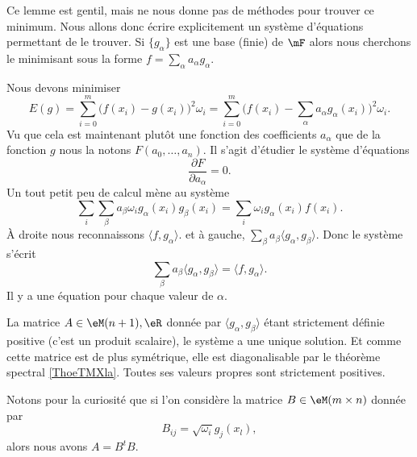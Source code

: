 \begin{normaltext}
    Ce lemme est gentil, mais ne nous donne pas de méthodes pour trouver ce minimum. Nous allons donc écrire explicitement un système d'équations permettant de le trouver. Si \( \{ g_{\alpha} \} \) est une base (finie) de \( \mF\) alors nous cherchons le minimisant sous la forme \( f=\sum_{\alpha}a_{\alpha}g_{\alpha}\). 

    Nous devons minimiser
    \begin{equation}
        E(g)=\sum_{i=0}^m\big( f(x_i)-g(x_i) \big)^2\omega_i=\sum_{i=0}^m\big( f(x_i)-\sum_{\alpha}a_{\alpha}g_{\alpha}(x_i) \big)^2\omega_i.
    \end{equation}
    Vu que cela est maintenant plutôt une fonction des coefficients \( a_{\alpha}\) que de la fonction \( g\) nous la notons \( F(a_0,\ldots, a_n)\). Il s'agit d'étudier le système d'équations
    \begin{equation}
        \frac{ \partial F }{ \partial a_{\alpha} }=0.
    \end{equation}
    Un tout petit peu de calcul mène au système
    \begin{equation}       
        \sum_i\sum_{\beta}a_{\beta}\omega_ig_{\alpha}(x_i)g_{\beta}(x_i)=\sum_{i}\omega_ig_{\alpha}(x_i)f(x_i).
    \end{equation}
    À droite nous reconnaissons \( \langle f, g_{\alpha}\rangle \). et à gauche, \( \sum_{\beta}a_{\beta}\langle g_{\alpha}, g_{\beta}\rangle \). Donc le système s'écrit
    \begin{equation}
        \sum_{\beta}a_{\beta}\langle g_{\alpha}, g_{\beta}\rangle =\langle f, g_{\alpha}\rangle .
    \end{equation}
    Il y a une équation pour chaque valeur de \( \alpha\).

    La matrice \( A\in\eM(n+1),\eR\) donnée par  \( \langle g_{\alpha}, g_{\beta}\rangle \) étant strictement définie positive (c'est un produit scalaire), le système a une unique solution. Et comme cette matrice est de plus symétrique, elle est diagonalisable par le théorème spectral \ref{ThoeTMXla}. Toutes ses valeurs propres sont strictement positives.

    Notons pour la curiosité que si l'on considère la matrice \( B\in\eM(m\times n)\) donnée par
    \begin{equation}
        B_{ij}=\sqrt{ \omega_i }g_j(x_l),
    \end{equation}
    alors nous avons \( A=B^tB\).
\end{normaltext}

